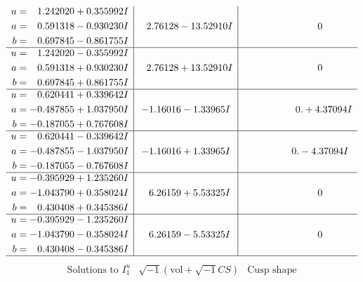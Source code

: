 \documentclass[1p]{elsarticle_modified}
\theoremstyle{definition}
\newcommand{\I}{\sqrt{-1}}
\begin{document}
$$\begin{array}{c|c|c}
\begin{aligned}
u &= \phantom{-}1.242020 + 0.355992 I \\
a &= \phantom{-}0.591318 - 0.930230 I \\
b &= \phantom{-}0.697845 - 0.861755 I\end{aligned}
 & \phantom{-}2.76128 - 13.52910 I & \phantom{-0.000000 } 0 \\ \hline\begin{aligned}
u &= \phantom{-}1.242020 - 0.355992 I \\
a &= \phantom{-}0.591318 + 0.930230 I \\
b &= \phantom{-}0.697845 + 0.861755 I\end{aligned}
 & \phantom{-}2.76128 + 13.52910 I & \phantom{-0.000000 } 0 \\ \hline\begin{aligned}
u &= \phantom{-}0.620441 + 0.339642 I \\
a &= -0.487855 + 1.037950 I \\
b &= -0.187055 + 0.767608 I\end{aligned}
 & -1.16016 - 1.33965 I & \phantom{-0.000000 -}0. + 4.37094 I \\ \hline\begin{aligned}
u &= \phantom{-}0.620441 - 0.339642 I \\
a &= -0.487855 - 1.037950 I \\
b &= -0.187055 - 0.767608 I\end{aligned}
 & -1.16016 + 1.33965 I & \phantom{-0.000000 } 0. - 4.37094 I \\ \hline\begin{aligned}
u &= -0.395929 + 1.235260 I \\
a &= -1.043790 + 0.358024 I \\
b &= \phantom{-}0.430408 + 0.345386 I\end{aligned}
 & \phantom{-}6.26159 + 5.53325 I & \phantom{-0.000000 } 0 \\ \hline\begin{aligned}
u &= -0.395929 - 1.235260 I \\
a &= -1.043790 - 0.358024 I \\
b &= \phantom{-}0.430408 - 0.345386 I\end{aligned}
 & \phantom{-}6.26159 - 5.53325 I & \phantom{-0.000000 } 0\\
 \hline 
 \end{array}$$\newpage$$\begin{array}{c|c|c}  
\text{Solutions to }I^u_{1}& \I (\text{vol} + \sqrt{-1}CS) & \text{Cusp shape}\\

\end{array}$$
\end{document}
